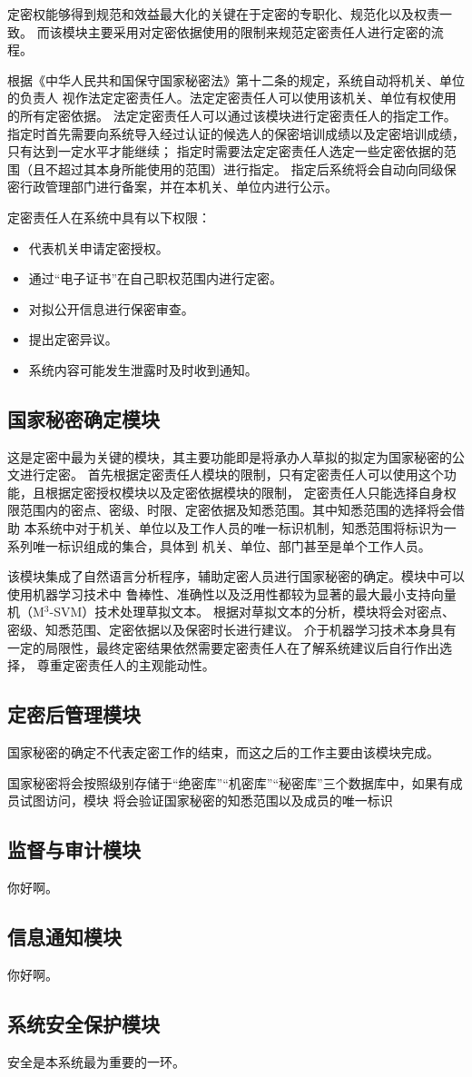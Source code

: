定密权能够得到规范和效益最大化的关键在于定密的专职化、规范化以及权责一致\cite{lunwoguodingmiquanzhuanzhi}。
而该模块主要采用对定密依据使用的限制来规范定密责任人进行定密的流程。

根据《中华人民共和国保守国家秘密法》第十二条的规定，系统自动将机关、单位的负责人
视作法定定密责任人。法定定密责任人可以使用该机关、单位有权使用的所有定密依据。
法定定密责任人可以通过该模块进行定密责任人的指定工作。
指定时首先需要向系统导入经过认证的候选人的保密培训成绩以及定密培训成绩，只有达到一定水平才能继续；
指定时需要法定定密责任人选定一些定密依据的范围（且不超过其本身所能使用的范围）进行指定。
指定后系统将会自动向同级保密行政管理部门进行备案，并在本机关、单位内进行公示。

定密责任人在系统中具有以下权限：
\begin{itemize}
    \item 代表机关申请定密授权。
    \item 通过“电子证书”在自己职权范围内进行定密。
    \item 对拟公开信息进行保密审查。
    \item 提出定密异议。
    \item 系统内容可能发生泄露时及时收到通知。
\end{itemize}

\subsection{国家秘密确定模块}
这是定密中最为关键的模块，其主要功能即是将承办人草拟的拟定为国家秘密的公文进行定密。
首先根据定密责任人模块的限制，只有定密责任人可以使用这个功能，且根据定密授权模块以及定密依据模块的限制，
定密责任人只能选择自身权限范围内的密点、密级、时限、定密依据及知悉范围。其中知悉范围的选择将会借助
本系统中对于机关、单位以及工作人员的唯一标识机制，知悉范围将标识为一系列唯一标识组成的集合，具体到
机关、单位、部门甚至是单个工作人员。

该模块集成了自然语言分析程序，辅助定密人员进行国家秘密的确定。模块中可以使用机器学习技术中
鲁棒性、准确性以及泛用性都较为显著的最大最小支持向量机（M\(^3\)-SVM）技术处理草拟文本\cite{jiyujiqixuexi}。
根据对草拟文本的分析，模块将会对密点、密级、知悉范围、定密依据以及保密时长进行建议。
介于机器学习技术本身具有一定的局限性，最终定密结果依然需要定密责任人在了解系统建议后自行作出选择，
尊重定密责任人的主观能动性。

\subsection{定密后管理模块}
国家秘密的确定不代表定密工作的结束，而这之后的工作主要由该模块完成。

国家秘密将会按照级别存储于“绝密库”“机密库”“秘密库”三个数据库中，如果有成员试图访问，模块
将会验证国家秘密的知悉范围以及成员的唯一标识

\subsection{监督与审计模块}
你好啊。

\subsection{信息通知模块}
你好啊。

\subsection{系统安全保护模块}
安全是本系统最为重要的一环。   